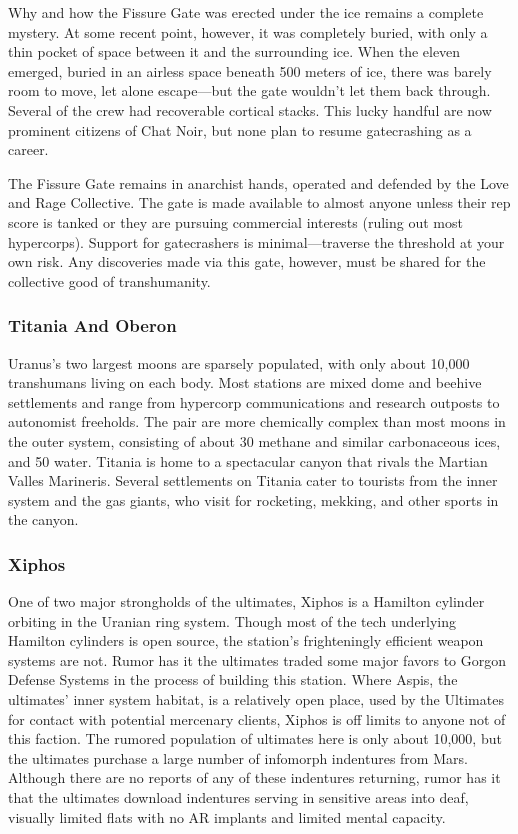 Why and how the Fissure Gate was erected under 
the ice remains a complete mystery. At some recent 
point, however, it was completely buried, with only 
a thin pocket of space between it and the surrounding ice. When the eleven emerged, buried in an 
airless space beneath 500 meters of ice, there was 
barely room to move, let alone escape—but the gate 
wouldn't let them back through. Several of the crew 
had recoverable cortical stacks. This lucky handful are 
now prominent citizens of Chat Noir, but none plan 
to resume gatecrashing as a career.

The Fissure Gate remains in anarchist hands, 
operated and defended by the Love and Rage Collective. The gate is made available to almost anyone 
unless their rep score is tanked or they are pursuing 
commercial interests (ruling out most hypercorps). 
Support for gatecrashers is minimal—traverse the 
threshold at your own risk. Any discoveries made via 
this gate, however, must be shared for the collective 
good of transhumanity.

\subsubsection{Titania And Oberon}

Uranus's two largest moons are sparsely populated, 
with only about 10,000 transhumans living on each 
body. Most stations are mixed dome and beehive settlements and range from hypercorp communications 
and research outposts to autonomist freeholds. The 
pair are more chemically complex than most moons in 
the outer system, consisting of about 30%
methane and similar carbonaceous ices, and 50%
water. Titania is home to a spectacular canyon that 
rivals the Martian Valles Marineris. Several settlements 
on Titania cater to tourists from the inner system and 
the gas giants, who visit for rocketing, mekking, and 
other sports in the canyon.

\subsubsection{Xiphos}

One of two major strongholds of the ultimates, Xiphos 
is a Hamilton cylinder orbiting in the Uranian ring 
system. Though most of the tech underlying Hamilton 
cylinders is open source, the station's frighteningly 
efficient weapon systems are not. Rumor has it the 
ultimates traded some major favors to Gorgon Defense Systems in the process of building this station. 
Where Aspis, the ultimates' inner system habitat, 
is a relatively open place, used by the Ultimates for 
contact with potential mercenary clients, Xiphos is 
off limits to anyone not of this faction. The rumored 
population of ultimates here is only about 10,000, but 
the ultimates purchase a large number of infomorph 
indentures from Mars. Although there are no reports 
of any of these indentures returning, rumor has it that 
the ultimates download indentures serving in sensitive areas into deaf, visually limited flats with no AR 
implants and limited mental capacity.

